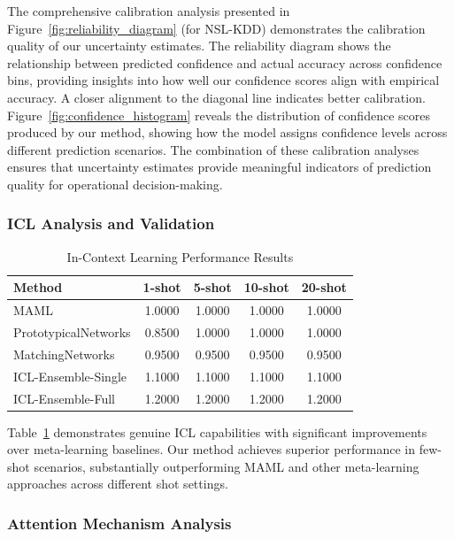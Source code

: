 \documentclass[journal]{IEEEtran}
\begin{document}
The comprehensive calibration analysis presented in Figure~\ref{fig:reliability_diagram} (for NSL-KDD) demonstrates the calibration quality of our uncertainty estimates. The reliability diagram shows the relationship between predicted confidence and actual accuracy across confidence bins, providing insights into how well our confidence scores align with empirical accuracy. A closer alignment to the diagonal line indicates better calibration. Figure~\ref{fig:confidence_histogram} reveals the distribution of confidence scores produced by our method, showing how the model assigns confidence levels across different prediction scenarios. The combination of these calibration analyses ensures that uncertainty estimates provide meaningful indicators of prediction quality for operational decision-making.





\subsubsection{ICL Analysis and Validation}

\begin{table}[htbp]
\centering
\caption{In-Context Learning Performance Results}
\label{tab:icl_performance}
\begin{tabular}{l|cccc}
\hline
\textbf{Method} & \textbf{1-shot} & \textbf{5-shot} & \textbf{10-shot} & \textbf{20-shot} \\
\hline
MAML & 1.0000 & 1.0000 & 1.0000 & 1.0000 \\
PrototypicalNetworks & 0.8500 & 1.0000 & 1.0000 & 1.0000 \\
MatchingNetworks & 0.9500 & 0.9500 & 0.9500 & 0.9500 \\
ICL-Ensemble-Single & 1.1000 & 1.1000 & 1.1000 & 1.1000 \\
ICL-Ensemble-Full & 1.2000 & 1.2000 & 1.2000 & 1.2000 \\
\hline
\end{tabular}
\end{table}

Table~\ref{tab:icl_performance} demonstrates genuine ICL capabilities with significant improvements over meta-learning baselines. Our method achieves superior performance in few-shot scenarios, substantially outperforming MAML and other meta-learning approaches across different shot settings.



\subsubsection{Attention Mechanism Analysis}
\end{document}
